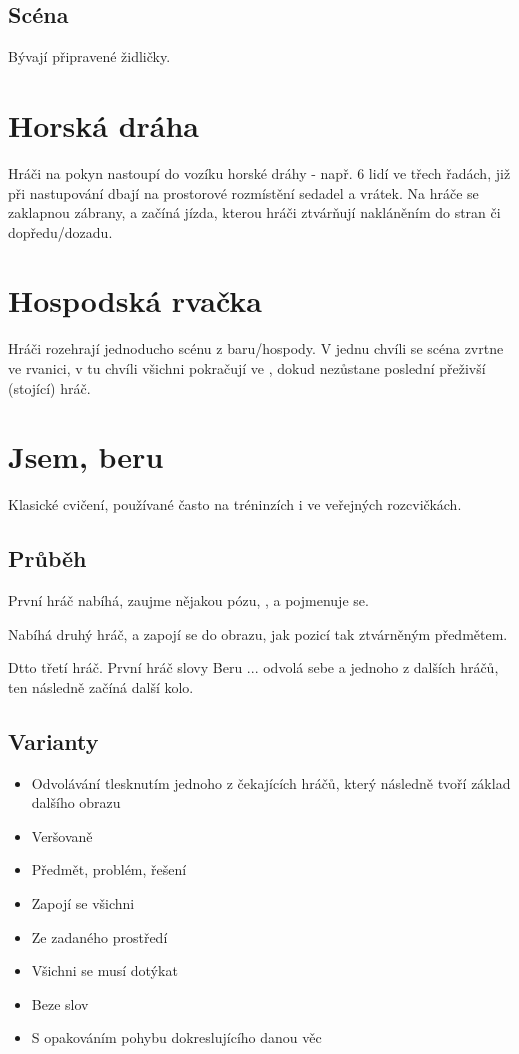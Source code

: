 \documentclass[main.tex]{subfiles}
\begin{document}
\subsection{Scéna} Bývají připravené židličky. 
 
 
\needspace{5cm} \section{Horská dráha} \label{horská dráha} Hráči na pokyn nastoupí do vozíku horské dráhy - např. 6 lidí ve třech řadách, 
již při nastupování dbají na prostorové rozmístění sedadel a vrátek. 
Na hráče se zaklapnou zábrany, a začíná jízda, kterou hráči ztvárňují nakláněním do stran či dopředu/dozadu. 
 
\needspace{5cm} \section{Hospodská rvačka} \label{hospodská rvačka} Hráči rozehrají jednoducho scénu z baru/hospody. V jednu chvíli se scéna zvrtne ve rvanici, v tu chvíli všichni pokračují ve , dokud nezůstane poslední přeživší (stojící) hráč. 
 
 
 
\needspace{5cm} \section{Jsem, beru} \label{jsem, beru} Klasické cvičení, používané často na tréninzích i ve veřejných rozcvičkách. 
\subsection{Průběh} První hráč nabíhá, zaujme nějakou pózu,  , a pojmenuje se. 
 
Nabíhá druhý hráč, a zapojí se do obrazu, jak pozicí tak ztvárněným předmětem.  
 
Dtto třetí hráč. 
První hráč slovy Beru ... odvolá sebe a jednoho z dalších hráčů, ten následně začíná další kolo. 
\subsection{Varianty} \begin{itemize}
\item Odvolávání tlesknutím jednoho z čekajících hráčů, který následně tvoří základ dalšího obrazu
\item Veršovaně
\item Předmět, problém, řešení
\item Zapojí se všichni
\item Ze zadaného prostředí
\item Všichni se musí dotýkat
\item Beze slov
\item S opakováním  pohybu dokreslujícího danou věc
\end{itemize}
 
\end{document}
